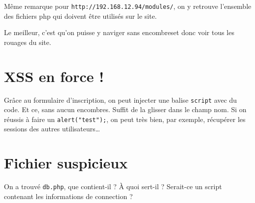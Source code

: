 \documentclass[oneside,10pt]{article}
\begin{document}
M\^eme remarque pour \verb+http://192.168.12.94/modules/+, on y retrouve l'ensemble des fichiers php qui doivent \^etre utilis\'es sur le site.

Le meilleur, c'est qu'on puisse y naviger sans encombreset donc voir tous les rouages du site.

\section{XSS en force !}
Gr\^ace au formulaire d'inscription, on peut injecter une balise \verb+script+ avec du code.
Et ce, sans aucun encombres.
Suffit de la glisser dans le champ nom.
Si on r\'eussis \`a faire un \verb+alert("test");+, on peut tr\`es bien, par exemple, r\'ecup\'erer les sessions des autres utilisateurs\ldots

\section{Fichier suspicieux}
On a trouv\'e \verb+db.php+, que contient-il ?
\`A quoi sert-il ?
Serait-ce un script contenant les informations de connection ?
\end{document}
